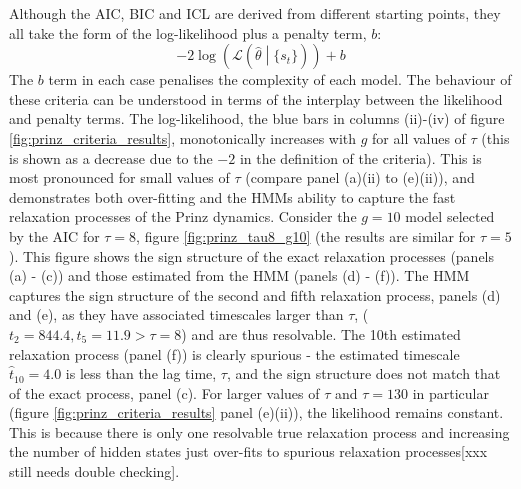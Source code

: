 Although the AIC, BIC and ICL are derived from different starting points, they all take the form of the log-likelihood plus a penalty term, $b$:
\begin{equation}
    -2\log{\left(\mathcal{L}\left(\hat{\theta} \middle|\{s_t\}\right)\right)} + b
\end{equation}
The $b$ term in each case penalises the complexity of each model. The behaviour of these criteria can be understood in terms of the interplay between the likelihood and penalty terms. The log-likelihood, the blue bars in columns (ii)-(iv) of figure \ref{fig:prinz_criteria_results}, monotonically increases with $g$ for all values of $\tau$ (this is shown as a decrease due to the $-2$ in the definition of the criteria). This is most pronounced for small values of $\tau$ (compare panel (a)(ii) to (e)(ii)), and demonstrates both over-fitting and the HMMs ability to capture the fast relaxation processes of the Prinz dynamics. Consider the $g=10$ model selected by the AIC for $\tau=8$, figure \ref{fig:prinz_tau8_g10} (the results are similar for $\tau=5$). This figure shows the sign structure of the exact relaxation processes (panels (a) - (c)) and those estimated from the HMM (panels (d) - (f)). The HMM captures the sign structure of the second and fifth relaxation process,  panels (d) and (e), as they have associated timescales larger than $\tau$, ($t_{2}=844.4, t_{5} = 11.9 > \tau=8$) and are thus resolvable. The 10th estimated relaxation process (panel (f)) is clearly spurious - the estimated timescale $\hat{t}_{10} = 4.0$ is less than the lag time, $\tau$, and the sign structure does not match that of the exact process, panel (c). For larger values of $\tau$ and $\tau= 130$ in particular (figure \ref{fig:prinz_criteria_results} panel (e)(ii)), the likelihood remains constant. This is because there is only one resolvable true relaxation process and increasing the number of hidden states just over-fits to spurious relaxation processes[xxx still needs double checking].  

